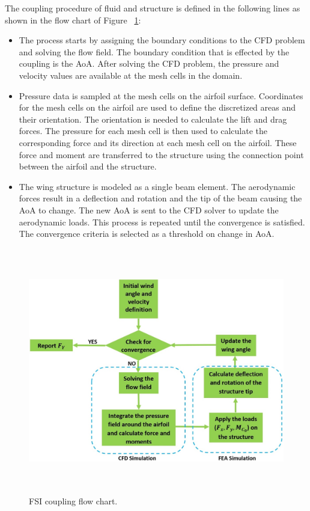 \documentclass[paper=a4, fontsize=12pt]{scrartcl} %
\begin{document}
%
The coupling procedure of fluid and structure is defined in the following lines as shown in the flow chart of Figure ~\ref{fig:FSI_simulation}:
%
\begin{itemize}
	\item The process starts by assigning the boundary conditions to the CFD problem and solving the flow field. The boundary condition that is effected by the coupling is the AoA. After solving the CFD problem, the pressure and velocity values are available at the mesh cells in the domain.

	\item Pressure data is sampled at the mesh cells on the airfoil surface. Coordinates for the mesh cells on the airfoil are used to define the discretized areas and their orientation. The orientation is needed to calculate the lift and drag forces. The pressure for each mesh cell is then used to calculate the corresponding force and its direction at each mesh cell on the airfoil. These force and moment are transferred to the structure using the connection point between the airfoil and the structure.

	\item The wing structure is modeled as a single beam element. The aerodynamic forces result in a deflection and rotation and the tip of the beam causing the AoA to change. The new AoA is sent to the CFD solver to update the aerodynamic loads. This process is repeated until the convergence is satisfied. The convergence criteria is selected as a threshold on change in AoA.
\end{itemize}
%
%
\begin{figure}[H]
	\centering
	\includegraphics[height=10.75cm]{FSI_simulation.jpg}
	\caption{FSI coupling flow chart.}
	\label{fig:FSI_simulation}
\end{figure}
\end{document}
